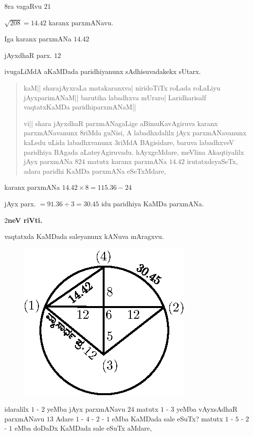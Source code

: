 $8$ra vagaRvu $21$

$\sqrt{208}=14.42$ karanx parxmANavu.

Iga karanx parxmANa $14.42$

jAyxdhaR parx. $12$

ivugaLiMdA aKaMDada paridhiyanunx sAdhisuvadakekx sUtarx.

\begin{verse}
kaM|| sharajAyxraLa matakaranxva| niridoTiTx roLada roLaLiyu
jAyxparimANaM|| barutiha labadhxva mUraro| Laridharisalf vaqtatxKaMDa
paridhiparxmANaM|| 

vi|| shara jAyxdhaR parxmANagaLige aBimuKavAgiruva karanx
parxmANavanunx $8$riMda guNisi, A labadhxdalilx jAyx parxmANavanunx
kaLedu uLida labadhxvanunx $3$riMdA BAgisidare, baruva labadhxveV
paridhiya BAgada aLateyAgiruvadu. hAyxgeMdare, meVlina Akaqtiyalilx
jAyx parxmANa $824$ matutx karanx parxmANa $14.42$ irutatxdeyaSeTx,
adara paridhi KaMDa parxmANa eSeTxMdare,
\end{verse}

karanx parxmANa $14.42\times 8=115.36-24$

jAyx parx. $=91.36\div 3=30.45$ idu paridhiya KaMDa parxmANa.

\medskip

\begin{center}
{\bf $2$neV riVti.}
\end{center}

vaqtatxda KaMDada saleyanunx kANuva mAragxvu.
\begin{figure}[H]
\centering
\includegraphics{figure/fig39.eps}
\end{figure}

idaralilx $1$ - $2$ yeMba jAyx parxmANavu $24$ matutx $1$ - $3$ yeMba
vAyxsAdhaR parxmANavu $13$ Adare $1$ - $4$ - $2$ - $1$ eMba KaMDada
sale eSuTx? matutx $1$ - $5$ - $2$ - $1$ eMba doDaDx KaMDada sale
eSuTx aMdare,


